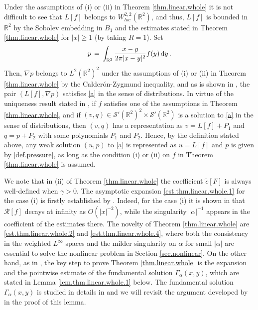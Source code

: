 \documentclass[11pt,a4paper]{article}
\newcommand{\R}{\mathbb{R}}
\newcommand{\dd}{\,{\rm d}}
\begin{document}
\begin{remark}\label{rem.thm.linear.whole} 
Under the assumptions of (i) or (ii) in Theorem \ref{thm.linear.whole} it is not difficult to see that $L[f]$ belongs to $W^{2,2}_{loc} (\R^2)$, and thus, $L[f]$ is bounded in $\R^2$ by the Sobolev embedding in $B_1$ and the estimates stated in Theorem \ref{thm.linear.whole} for $|x|\geq 1$ (by taking $R=1$). Set 
%
\begin{align}
p \,=\, \int_{\R^2} \frac{x-y}{2\pi |x-y|^2} f (y) \dd y\,.\label{def.pressure}
\end{align}
%
Then, $\nabla p$ belongs to $L^2 (\R^2)^2$ under the assumptions of (i) or (ii) in Theorem \ref{thm.linear.whole} by the Calder{\'o}n-Zygmund inequality, and as is shown in \cite[Proposition 3.2]{H3}, the pair $(L[f], \nabla p)$ satisfies \eqref{a} in the sense of distributions. In virtue of the uniqueness result stated in \cite[Lemma 3.5]{H3}, 
if $f$ satisfies one of the assumptions in Theorem \ref{thm.linear.whole}, and if $(v,q) \in \mathcal{S}'(\R^2)^2 \times \mathcal{S}'(\R^2)$ is a solution to \eqref{a} in the sense of distributions, then $(v,q)$ has a representation as $v=L[f]+P_{1}$ and $q=p+P_{2}$ with some polynomials $P_{1}$ and $P_{2}$. Hence, by the definition stated above, any weak solution $(u, p)$ to \eqref{a} is represented as $u=L[f]$ and $p$ is given by \eqref{def.pressure}, as long as the condition (i) or (ii) on $f$ in Theorem \ref{thm.linear.whole} is assumed.
\end{remark}

We note that in (ii) of Theorem \ref{thm.linear.whole} the coefficient $\tilde c[F]$ is always well-defined when $\gamma>0$. The asymptotic expansion \eqref{est.thm.linear.whole.1} for the case (i)  is firstly established by \cite[Proposition 3.2]{H3}.
Indeed, for the case (i) it is shown in \cite[Proposition 3.2]{H3} that
 $\mathcal{R}[f]$ decays at infinity as $O(|x|^{-2})$,
while the singularity $|\alpha|^{-1}$ appears in the coefficient of the estimates there.
\noindent The novelty of Theorem \ref{thm.linear.whole} are \eqref{est.thm.linear.whole.2} and \eqref{est.thm.linear.whole.4},
where both the consistency in the weighted $L^\infty$ spaces and the milder singularity on $\alpha$ for small $|\alpha|$ are essential to solve the nonlinear problem in Section \ref{sec.nonlinear}. 
On the other hand, as in \cite{H3}, the key step to prove Theorem \ref{thm.linear.whole} is the expansion and 
the pointwise estimate of the fundamental solution $\Gamma_\alpha (x,y)$, which are stated in Lemma \ref{lem.thm.linear.whole.1} below. The fundamental solution $\Gamma_\alpha (x,y)$ is studied in details in \cite[Proposition 3.1]{H3} and we will revisit the argument developed by \cite{H3} in the proof of this lemma.
\end{document}
